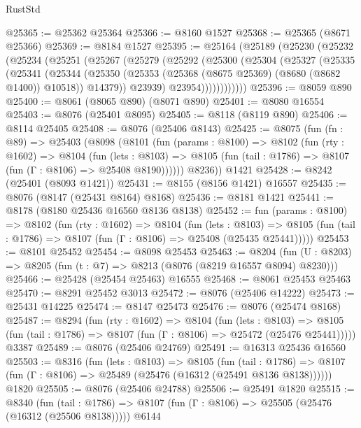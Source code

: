 \begin{lexlean}{RustStd}
\begin{coremodule}
@25365 := @25362 @25364
@25366 := @8160 @1527
@25368 := @25365 (@8671 @25366)
@25369 := @8184 @1527
@25395 := @25164
    (@25189
      (@25230
        (@25232
          (@25234
            (@25251
              (@25267
                (@25279
                  (@25292
                    (@25300
                      (@25304
                        (@25327
                          (@25335
                            (@25341
                              (@25344
                                (@25350
                                  (@25353 (@25368 (@8675 @25369) (@8680 (@8682 @1400)) @10518))
                                  @14379))
                              @23939)
                            @23954))))))))))))
@25396 := @8059 @890
@25400 := @8061 (@8065 @890) (@8071 @890)
@25401 := @8080 @16554
@25403 := @8076 (@25401 @8095)
@25405 := @8118 (@8119 @890)
@25406 := @8114 @25405
@25408 := @8076 (@25406 @8143)
@25425 := @8075
    (fun (fn : @89) =>
    @25403
      (@8098
        (@8101
          (fun (params : @8100) =>
          @8102
            (fun (rty : @1602) =>
            @8104
              (fun (lets : @8103) =>
              @8105 (fun (tail : @1786) => @8107 (fun (Γ : @8106) => @25408 @8190))))))
        @8236))
    @1421
@25428 := @8242 (@25401 (@8093 @1421))
@25431 := @8155 (@8156 @1421) @16557
@25435 := @8076 (@8147 (@25431 @8164) @8168)
@25436 := @8181 @1421
@25441 := @8178 (@8180 @25436 @16560 @8136 @8138)
@25452 := fun (params : @8100) =>
  @8102
    (fun (rty : @1602) =>
    @8104
      (fun (lets : @8103) =>
      @8105 (fun (tail : @1786) => @8107 (fun (Γ : @8106) => @25408 (@25435 @25441)))))
@25453 := @8101 @25452
@25454 := @8098 @25453
@25463 := @8204
    (fun (U : @8203) => @8205 (fun (t : @7) => @8213 (@8076 (@8219 @16557 @8094) @8230)))
@25466 := @25428 (@25454 @25463) @16555
@25468 := @8061 @25453 @25463
@25470 := @8291 @25452 @3013
@25472 := @8076 (@25406 @14222)
@25473 := @25431 @14225
@25474 := @8147 @25473
@25476 := @8076 (@25474 @8168)
@25487 := @8294
    (fun (rty : @1602) =>
    @8104
      (fun (lets : @8103) =>
      @8105 (fun (tail : @1786) => @8107 (fun (Γ : @8106) => @25472 (@25476 @25441)))))
    @3387
@25489 := @8076 (@25406 @24769)
@25491 := @16313 @25436 @16560
@25503 := @8316
    (fun (lets : @8103) =>
    @8105
      (fun (tail : @1786) =>
      @8107 (fun (Γ : @8106) => @25489 (@25476 (@16312 (@25491 @8136 @8138))))))
    @1820
@25505 := @8076 (@25406 @24788)
@25506 := @25491 @1820
@25515 := @8340
    (fun (tail : @1786) => @8107 (fun (Γ : @8106) => @25505 (@25476 (@16312 (@25506 @8138)))))
    @6144

\end{coremodule}
\end{lexlean}

